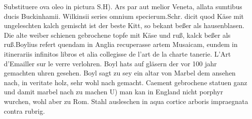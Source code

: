 \pstart Substituere ova oleo in pictura S.H). Ars  par aut melior Veneta, allata sumtibus ducis Buckinhamii\protect{}.\pend 
\pstart Wilkinsii\protect{} series omnium specierum.\pend \pstart Schr. dicit quod K\"{a}se\protect{} mit ungeleschten kalch gemischt ist der beste Kitt\protect{}, so bekant beßer als hausenblasen. Die alte weiber schienen gebrochene topfe mit K\"{a}se\protect{} und ruß, kalck beßer als ruß.\pend \pstart Boylius\protect{} refert quendam in Anglia\protect{} recuperasse artem Musaicam\protect{}, eundem in itinerariis infinitos libros et alia collegisse de l'art de la charte tanerie. \pend \pstart L'Art d'Emailler sur le verre verlohren. Boyl\protect{} hats auf gl\"{a}sern der vor 100 jahr gemachten uhren gesehen. Boyl\protect{} sagt zu  sey ein altar von Marbel\protect{} dem ansehen nach, in veritate holz, sehr wohl nach gemacht. Caement gebrochene statuen ganz und damit marbel nach zu machen U) man kan in England\protect{} nicht porphyr\protect{} wurchen, wohl aber zu Rom. Stahl\protect{} ausleschen in aqua cortice arboris impraegnata contra rubrig.\pend